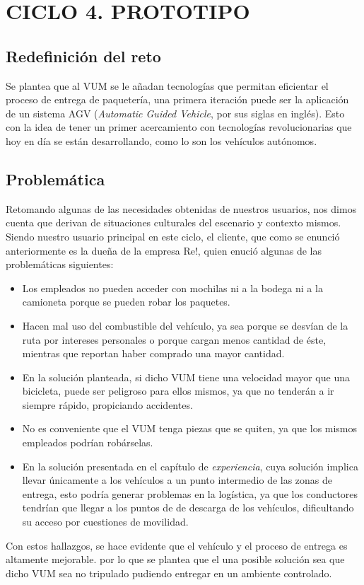 \chapter{CICLO 4. PROTOTIPO}

\section{Redefinición del reto}

Se plantea que al VUM se le añadan tecnologías que permitan eficientar el proceso de entrega de paquetería, una primera iteración puede ser la aplicación de un sistema AGV (\textit{Automatic Guided Vehicle}, por sus siglas en inglés). Esto con la idea de tener un primer acercamiento con tecnologías revolucionarias que hoy en día se están desarrollando, como lo son los vehículos autónomos.

\section{Problemática}

Retomando algunas de las necesidades obtenidas de nuestros usuarios, nos dimos cuenta que derivan de situaciones culturales del escenario y contexto mismos. Siendo nuestro usuario principal en este ciclo, el cliente, que como se enunció anteriormente es la dueña de la empresa Re!, quien enució algunas de las problemáticas siguientes:

\begin{itemize}
\item Los empleados no pueden acceder con mochilas ni a la bodega ni a la camioneta porque se pueden robar los paquetes.

\item Hacen mal uso del combustible del vehículo, ya sea porque se desvían de la ruta por intereses personales o porque cargan menos cantidad de éste, mientras que reportan haber comprado una mayor cantidad.

\item En la solución planteada, si dicho VUM tiene una velocidad mayor que una bicicleta, puede ser peligroso para ellos mismos, ya que no tenderán a ir siempre rápido, propiciando accidentes.

\item No es conveniente que el VUM tenga piezas que se quiten, ya que los mismos empleados podrían robárselas.

\item En la solución presentada en el capítulo de \textit{experiencia}, cuya solución implica llevar únicamente a los vehículos a un punto intermedio de las zonas de entrega, esto podría generar problemas en la logística, ya que los conductores tendrían que llegar a los puntos de de descarga de los vehículos, dificultando su acceso por cuestiones de movilidad.

\end{itemize}
Con estos hallazgos, se hace evidente que el vehículo y el proceso de entrega es altamente mejorable. por lo que se plantea que el una posible solución sea que dicho VUM sea no tripulado pudiendo entregar en un ambiente controlado.

